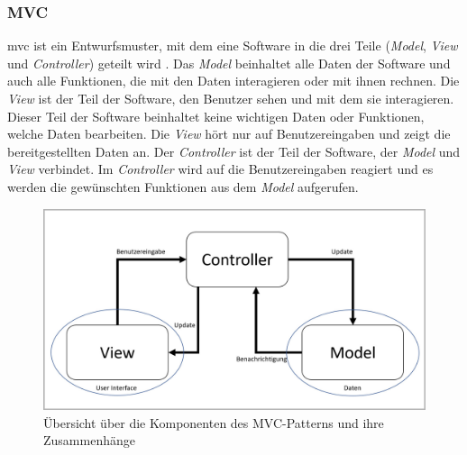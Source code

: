 \subsubsection{MVC}
\Gls{mvc} ist ein Entwurfsmuster, mit dem eine Software in die drei Teile (\textit{Model}, \textit{View} und \textit{Controller}) geteilt wird \cite{mvc}. Das \textit{Model} beinhaltet alle Daten der Software und auch alle Funktionen, die mit den Daten interagieren oder mit ihnen rechnen. Die \textit{View} ist der Teil der Software, den Benutzer sehen und mit dem sie interagieren. Dieser Teil der Software beinhaltet keine wichtigen Daten oder Funktionen, welche Daten bearbeiten. Die \textit{View} hört nur auf Benutzereingaben und zeigt die bereitgestellten Daten an. Der \textit{Controller} ist der Teil der Software, der \textit{Model} und \textit{View} verbindet. Im \textit{Controller} wird auf die Benutzereingaben reagiert und es werden die gewünschten Funktionen aus dem \textit{Model} aufgerufen.
\begin{figure}[H]
	\centering
	\includegraphics[width=0.75\linewidth]{images/rfoster_study/mvc}
	\caption[Übersicht des MVC-Patterns]{Übersicht über die Komponenten des MVC-Patterns und ihre Zusammenhänge}
	\label{fig:mvc}
\end{figure}

